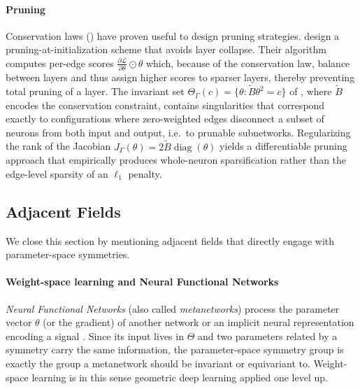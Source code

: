 \documentclass[mathematics,review,submit,moreauthors]{Definitions/mdpi}
\begin{document}
\paragraph{Pruning}
Conservation laws () have proven useful to design pruning strategies.
\citet{tanaka2020anips} design a pruning-at-initialization scheme that avoids layer collapse.
Their algorithm computes per-edge scores $\frac{\partial \mathcal{L}}{\partial \theta}\odot \theta$ which, because of the conservation law, balance between layers and thus assign higher scores to sparser layers, thereby preventing total pruning of a layer.
The invariant set $\Theta_\Gamma(c)=\{\theta:\tilde{B}\theta^2=c\}$ of \citet{nurisso2025}, where $\tilde B$ encodes the conservation constraint, contains singularities that correspond exactly to configurations where zero-weighted edges disconnect a subset of neurons from both input and output, i.e.\ to prunable subnetworks.
Regularizing the rank of the Jacobian $J_\Gamma(\theta)=2\tilde{B}\operatorname{diag}(\theta)$ yields a differentiable pruning approach that empirically produces whole-neuron sparsification rather than the edge-level sparsity of an $\ell_1$ penalty.

\subsection{Adjacent Fields}\label{sec:adjacent-fields}
We close this section by mentioning adjacent fields that directly engage with parameter-space symmetries.

\paragraph{Weight-space learning and Neural Functional Networks}
\emph{Neural Functional Networks} \citep{zhou2023} (also called \emph{metanetworks}) process the parameter vector $\theta$ (or the gradient) of another network or an implicit neural representation encoding a signal \citep[INR,][]{sitzmann2020anips}.
Since its input lives in $\Theta$ and two parameters related by a symmetry carry the same information, the parameter-space symmetry group is exactly the group a metanetwork should be invariant or equivariant to.
Weight-space learning is in this sense geometric deep learning applied one level up.
\end{document}
